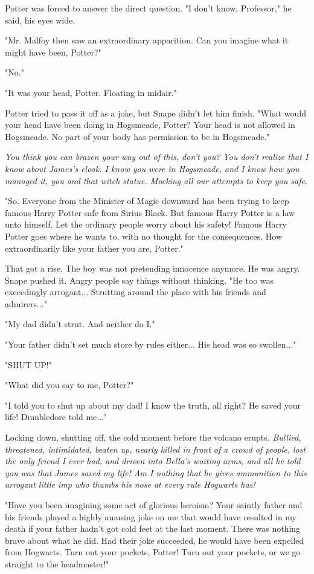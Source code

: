 \documentclass[a4paper,11pt]{article}
\begin{document}
Potter was forced to answer the direct question. "I don't know, Professor," he said, his eyes wide.

"Mr. Malfoy then saw an extraordinary apparition. Can you imagine what it might have been, Potter?"

"No."

"It was your head, Potter. Floating in midair."

Potter tried to pass it off as a joke, but Snape didn't let him finish. "What would your head have been doing in Hogsmeade, Potter? Your head is not allowed in Hogsmeade. No part of your body has permission to be in Hogsmeade."

\emph{You think you can brazen your way out of this, don't you? You don't realize that I know about James's cloak. I know you were in Hogsmeade, and I know how you managed it, you and that witch statue. Mocking all our attempts to keep you safe.}

"So. Everyone from the Minister of Magic downward has been trying to keep famous Harry Potter safe from Sirius Black. But famous Harry Potter is a law unto himself. Let the ordinary people worry about his safety! Famous Harry Potter goes where he wants to, with no thought for the consequences. How extraordinarily like your father you are, Potter."

That got a rise. The boy was not pretending innocence anymore. He was angry. Snape pushed it. Angry people say things without thinking. "He too was exceedingly arrogant... Strutting around the place with his friends and admirers..."

"My dad didn't strut. And neither do I."

"Your father didn't set much store by rules either... His head was so swollen..."

"SHUT UP!"

"What did you say to me, Potter?"

"I told you to shut up about my dad! I know the truth, all right? He saved your life! Dumbledore told me..."

Locking down, shutting off, the cold moment before the volcano erupts. \emph{Bullied, threatened, intimidated, beaten up, nearly killed in front of a crowd of people, lost the only friend I ever had, and driven into Bella's waiting arms, and all he told you was that James saved my life! Am I nothing that he gives ammunition to this arrogant little imp who thumbs his nose at every rule Hogwarts has!}

"Have you been imagining some act of glorious heroism? Your saintly father and his friends played a highly amusing joke on me that would have resulted in my death if your father hadn't got cold feet at the last moment. There was nothing brave about what he did. Had their joke succeeded, he would have been expelled from Hogwarts. Turn out your pockets, Potter! Turn out your pockets, or we go straight to the headmaster!"
\end{document}
